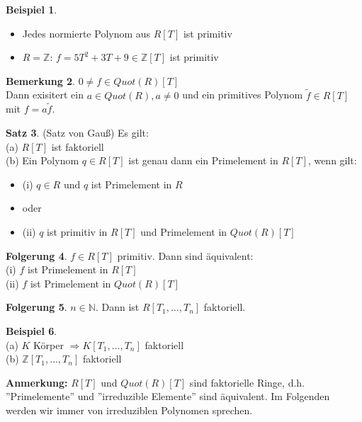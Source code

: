 \documentclass[10pt,a4paper,numbers=endperiod]{scrreprt}
\theoremstyle{definition}
\newtheorem{satz}{Satz}[section]
\newtheorem{bem}[satz]{Bemerkung}
\newtheorem{bsp}[satz]{Beispiel}
\newtheorem{folg}[satz]{Folgerung}
\def\NN{{\mathbb N}}
\def\ZZ{{\mathbb Z}}
\begin{document}
\begin{bsp}
	\begin{itemize}
		\item Jedes normierte Polynom aus $R[T]$ ist primitiv
		\item $R = \ZZ$: $f = 5T^2 + 3T+9 \in \ZZ[T]$ ist primitiv
	\end{itemize}
\end{bsp}

\begin{bem}
	$0 \neq f \in Quot(R)[T]$\\
	Dann exisitert ein $a \in Quot(R), a \neq 0$ und ein primitives Polynom $\tilde{f} \in R[T]$ mit $f = a \tilde{f}$.
\end{bem}
	
\begin{satz}
	(Satz von Gauß) Es gilt:\\
	(a) $R[T]$ ist faktoriell\\
	(b) Ein Polynom $q \in R[T]$ ist genau dann ein Primelement in $R[T]$, wenn gilt:
	\begin{itemize}
		\item[] (i) $q \in R$ und $q$ ist Primelement in $R$
		\item[] oder
		\item[] (ii)  $q$ ist primitiv in $R[T]$ und Primelement in $Quot(R)[T]$
	\end{itemize} 
\end{satz}

\begin{folg}
	$f \in R[T]$ primitiv. Dann sind äquivalent:\\
	(i) $f$ ist Primelement in $R[T]$\\
	(ii) $f$ ist Primelement in $Quot(R)[T]$
\end{folg}

\begin{folg}
	$n \in \NN$. Dann ist $R[T_1, \ldots, T_n]$ faktoriell. 
\end{folg}

\begin{bsp}
	$ $\\
	(a) $K$ Körper $\Rightarrow K[T_1, \ldots, T_n]$ faktoriell\\
	(b) $\ZZ[T_1, \ldots, T_n]$ faktoriell
\end{bsp}

\textbf{Anmerkung:} $R[T]$ und $Quot(R)[T]$ sind faktorielle Ringe, d.h. ''Primelemente'' und ''irreduzible Elemente'' sind äquivalent. Im Folgenden werden wir immer von irreduziblen Polynomen sprechen.
\end{document}
